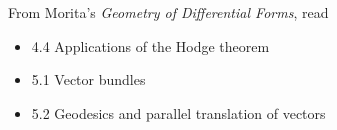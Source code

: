 \documentclass{homework}
\author{Jim Fowler}
\date{Week 11: Vector Bundles}
\begin{document}
\maketitle

From Morita's \textit{Geometry of Differential Forms}, read
\begin{itemize}
\item 4.4 Applications of the Hodge theorem
\item 5.1 Vector bundles
\item 5.2 Geodesics and parallel translation of vectors
\end{itemize}
\end{document}
